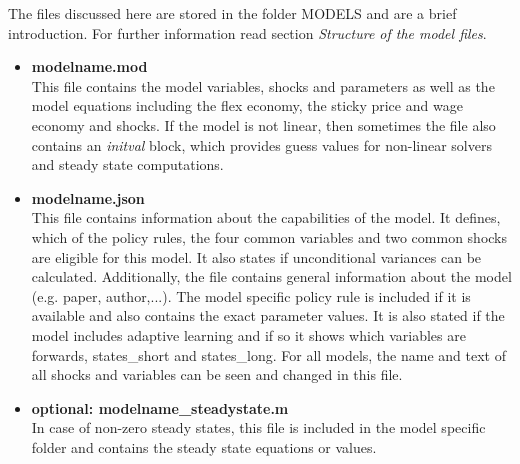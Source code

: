The files discussed here are stored in the folder MODELS and are a brief introduction. For further information read section \textit{Structure of the model files}.

\begin{itemize}
\item \textbf{modelname.mod}\\
This file contains the model variables, shocks and parameters as well as the model equations including the flex economy, the sticky price and wage economy and shocks. If the model is not linear, then sometimes the file also contains an \textit{initval} block, which provides guess values for non-linear solvers and steady state computations.
\item \textbf{modelname.json}\\
This file contains information about the capabilities of the model. It defines, which of the policy rules, the four common variables and two common shocks are eligible for this model. It also states if unconditional variances can be calculated. Additionally, the file contains general information about the model (e.g. paper, author,...). The model specific policy rule is included if it is available and also contains the exact parameter values. It is also stated if the model includes adaptive learning and if so it shows which variables are forwards, states\_short and states\_long. For all models, the name and text of all shocks and variables can be seen and changed in this file.
\item \textbf{optional: modelname\_steadystate.m}\\
In case of non-zero steady states, this file is included in the model specific folder and contains the steady state equations or values. 
\end{itemize}


